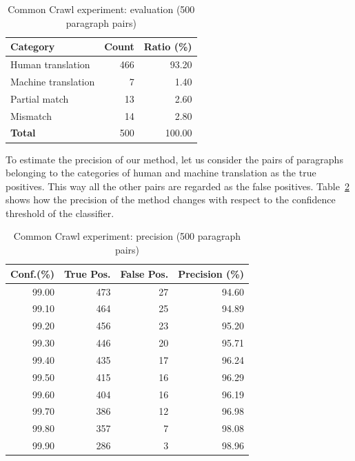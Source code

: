 \begin{table}[!htb]
	\centering
	\caption{Common Crawl experiment: evaluation (500 paragraph pairs)}
	\label{table:common_crawl_refine}
	\vspace{1em}
	\begin{tabular}{|l|r|r|}
		\hline
		\textbf{Category} & \textbf{Count} & \textbf{Ratio (\%)} \\
		\hline
		Human translation & 466 & 93.20 \\
		Machine translation & 7 & 1.40 \\
		Partial match & 13 & 2.60 \\
		Mismatch & 14 & 2.80 \\
		\hline
		\textbf{Total} & 500 & 100.00 \\
		\hline
	\end{tabular}
\end{table}

To estimate the precision of our method, let us consider the pairs of paragraphs belonging to the categories of human and machine translation as the true positives. This way all the other pairs are regarded as the false positives. Table~\ref{table:common_crawl_precision} shows how the precision of the method changes with respect to the confidence threshold of the classifier.

\begin{table}[!htb]
	\centering
	\caption{Common Crawl experiment: precision (500 paragraph pairs)}
	\label{table:common_crawl_precision}
	\vspace{1em}
	\begin{tabular}{|r|r|r|r|}
		\hline
		\textbf{Conf.(\%)} & \textbf{True Pos.} & \textbf{False Pos.} & \textbf{Precision (\%)} \\ \hline
		99.00 & 473 & 27 & 94.60 \\
		99.10 & 464 & 25 & 94.89 \\
		99.20 & 456 & 23 & 95.20 \\
		99.30 & 446 & 20 & 95.71 \\
		99.40 & 435 & 17 & 96.24 \\
		99.50 & 415 & 16 & 96.29 \\
		99.60 & 404 & 16 & 96.19 \\
		99.70 & 386 & 12 & 96.98 \\
		99.80 & 357 & 7 & 98.08 \\
		99.90 & 286 & 3 & 98.96 \\
		\hline
	\end{tabular}
\end{table}

